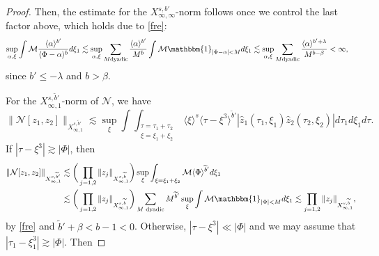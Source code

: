 \documentclass[%
11pt,  reqno]{amsart}
\newcommand{\jap}[1]{\langle #1 \rangle}
\newcommand{\5}{\textup{V}}
\newcommand{\noi}{\noindent}
\newcommand{\ft}{\widehat}
\newcommand{\les}{\lesssim}
\newcommand{\wt}{\widetilde}
\theoremstyle{remark}
\newcommand{\jb}[1]
{\langle #1 \rangle}
\numberwithin{equation}{section}
\numberwithin{theorem}{section}
\newcommand{\Ncal}{\mathcal{N}}
\begin{document}
\begin{proof}
		\noi 
Then, the estimate for the $X^{s, b'}_{\infty, \infty}$-norm follows once we control the last factor above, which holds due to \eqref{fre}:
			\begin{align}
			\sup_{\alpha,\xi} \int \mathcal{M}\frac{\jap{\alpha}^{b'}}{\jap{\Phi-\alpha}^b  } d\xi_1
&
\les 
\sup_{\alpha,\xi}\sum_{M \text{dyadic}} \frac{\jap{\alpha}^{b'}}{M^{b}}\int \mathcal{M}\mathbbm{1}_{|\Phi-\alpha|<M} d\xi_1 \lesssim \sup_{\alpha,\xi}\sum_{M \text{dyadic}} \frac{\jap{\alpha}^{b'+\lambda}}{M^{b-\beta}} <\infty,
			\end{align}
			since $b'\le -\lambda$ and $b>\beta$.

For the $X^{s,\wt{b}'}_{\infty, 1}$-norm of $\Ncal$, we have 
			\begin{equation}
				\|\Ncal[z_1,z_2]\|_{X^{s,\wt{b}'}_{\infty,1}} \lesssim \sup_\xi
\int  \int_{\substack{\tau=\tau_1+\tau_2 \\ \xi = \xi_1 + \xi_2}} 
\jb{\xi}^s
 \jap{\tau-\xi^3}^{\wt{b}'}  | \ft{z}_1 (\tau_1, \xi_1) \ft{z}_2(\tau_2, \xi_2)|  d\tau_1 d\xi_1 d\tau.
			\end{equation}
			If $|\tau-\xi^3|\gtrsim |\Phi|$, then
			\begin{align}
				\|\Ncal[z_1,z_2]\|_{X^{s,\wt{b}'}_{\infty,1}} 
&
\lesssim 
\bigg( 
\prod_{j=1, 2}\|z_j\|_{X^{s,\wt{b}}_{\infty,1}}
\bigg)
\sup_\xi \int_{\xi=\xi_1+\xi_2} \mathcal{M} \jap{\Phi}^{\wt{b}'} d\xi_1  \\
&
\lesssim 
\bigg( 
\prod_{j=1, 2}\|z_j\|_{X^{s,\wt{b}}_{\infty,1}}
\bigg)
\sum_{M \text{ dyadic}} M^{\wt{b}'} \sup_\xi \int \mathcal{M} \mathbbm{1}_{|\Phi|<M} d\xi_1 
 \lesssim 
\prod_{j=1, 2}\|z_j\|_{X^{s,\wt{b}}_{\infty,1}} ,
			\end{align}
			by \eqref{fre} and $\wt{b}'+\beta<b-1<0$. 
Otherwise, $|\tau-\xi^3|\ll |\Phi|$ and we may assume that $|\tau_1-\xi_1^3|\gtrsim |\Phi|$. Then



\end{proof}
\end{document}
